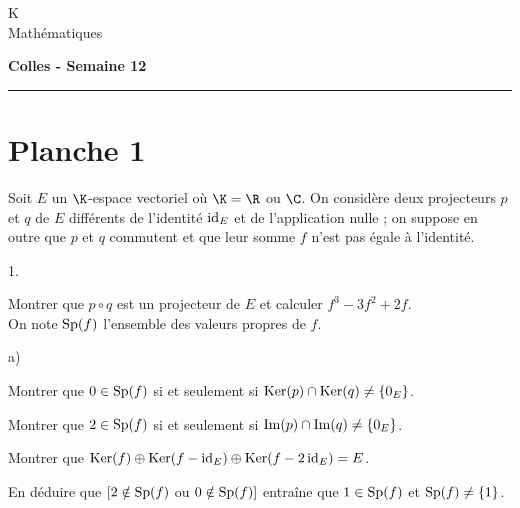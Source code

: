 \documentclass[11pt]{article}%
\begin{document}
\begin{flushleft}
K \\
Mathématiques
\end{flushleft}

\begin{center}
\textbf{\Large{Colles - Semaine 12}}
\end{center}

\hrule

\vspace*{0,2cm}

\section*{Planche 1} %
\noindent
Soit $E$ un $\K$-espace vectoriel où $\K=\R$ ou $\C$. On
considère deux projecteurs $p$ et $q$ de $E$ différents de
l'identité ${\rm{id}}_E$ et de l'application nulle ; on suppose en outre
que $p$ et $q$ commutent et que leur somme $f$ n'est pas égale
à l'identité.

\begin{noliste}{1.}
\item
Montrer que $p\circ q$ est un projecteur de $E$ et calculer
$f^3-3f^2+2f$.\\
On note $\operatorname{Sp}(f)$ l'ensemble des valeurs propres de $f$.

\item
\begin{noliste}{a)}
\item
 Montrer que $0\in\operatorname{Sp}(f)$ si et seulement si $\operatorname{Ker}(p)\cap\operatorname{Ker}(q) \neq 
 \{0_E\}$.

\item
Montrer que $2\in\operatorname{Sp}(f)$ si et seulement si $\operatorname{Im}(p)\cap \operatorname{Im}(q)\neq 
\{0_E\}$.

\item
Montrer que $\operatorname{Ker}(f)\oplus \operatorname{Ker}(f- {\rm{id}}_E)\oplus\operatorname{Ker}(f-2 \, {\rm{id}}_E)=E$.

\end{noliste}

\item
En déduire que $[2\notin\operatorname{Sp}(f)$ ou $0\notin\operatorname{Sp} (f)]$
entraîne
que $1\in\operatorname{Sp}(f)$ et $\operatorname{Sp}(f)\neq\{1\}$.
\end{noliste}


\newpage
\end{document}
